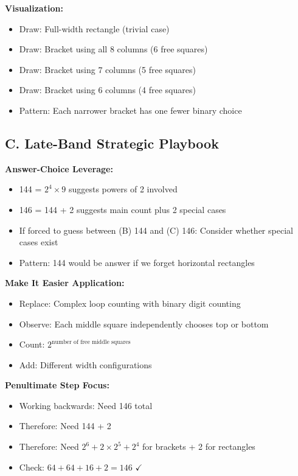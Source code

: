 \documentclass[12pt]{article}
\begin{document}
\begin{strategicbox}
\textbf{Visualization:}
\begin{itemize}
    \item Draw: Full-width rectangle (trivial case)
    \item Draw: Bracket using all 8 columns (6 free squares)
    \item Draw: Bracket using 7 columns (5 free squares)
    \item Draw: Bracket using 6 columns (4 free squares)
    \item Pattern: Each narrower bracket has one fewer binary choice
\end{itemize}

\subsection*{C. Late-Band Strategic Playbook}

\textbf{Answer-Choice Leverage:}
\begin{itemize}
    \item 144 = $2^4 \times 9$ suggests powers of 2 involved
    \item 146 = 144 + 2 suggests main count plus 2 special cases
    \item If forced to guess between (B) 144 and (C) 146: Consider whether special cases exist
    \item Pattern: 144 would be answer if we forget horizontal rectangles
\end{itemize}

\textbf{Make It Easier Application:}
\begin{itemize}
    \item Replace: Complex loop counting with binary digit counting
    \item Observe: Each middle square independently chooses top or bottom
    \item Count: $2^{\text{number of free middle squares}}$
    \item Add: Different width configurations
\end{itemize}

\textbf{Penultimate Step Focus:}
\begin{itemize}
    \item Working backwards: Need 146 total
    \item Therefore: Need 144 + 2
    \item Therefore: Need $2^6 + 2 \times 2^5 + 2^4$ for brackets + 2 for rectangles
    \item Check: $64 + 64 + 16 + 2 = 146$ $\checkmark$
\end{itemize}


\end{strategicbox}
\end{document}

